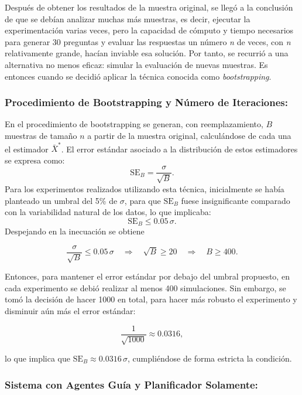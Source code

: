 \documentclass[10pt]{llncs}
\begin{document}
Después de obtener los resultados de la muestra original, se llegó a la conclusión de que se debían analizar muchas más muestras, es decir, ejecutar la experimentación varias veces, pero la capacidad de cómputo y tiempo necesarios para generar 30 preguntas y evaluar las respuestas un número \textit{n} de veces, con \textit{n} relativamente 
grande, hacían inviable esa solución. Por tanto, se recurrió a una alternativa no menos eficaz: simular la evaluación de nuevas muestras. Es entonces cuando se decidió aplicar la técnica conocida como \textit{bootstrapping}.

\subsubsection{Procedimiento de Bootstrapping y Número de Iteraciones:}

En el procedimiento de bootstrapping se generan, con reemplazamiento, $B$ muestras de tamaño $n$ a partir de la muestra original, calculándose de cada una el estimador $\bar{X}^*$.
El error estándar asociado a la distribución de estos estimadores se expresa como:
\begin{equation}
\text{SE}_B = \frac{\sigma}{\sqrt{B}}.
\end{equation}
Para los experimentos realizados utilizando esta técnica, inicialmente se había planteado un umbral del 5\% de $\sigma$, para que $\text{SE}_B$ fuese insignificante comparado con la variabilidad natural de los datos, lo que implicaba:
\begin{equation}
\text{SE}_B \leq 0.05\,\sigma.
\end{equation}
Despejando en la inecuación se obtiene


\[
\frac{\sigma}{\sqrt{B}} \leq 0.05\,\sigma \quad \Longrightarrow \quad \sqrt{B} \geq 20 \quad \Longrightarrow \quad B \geq 400.
\]


Entonces, para mantener el error estándar por debajo del umbral propuesto, en cada experimento se debió realizar al menos 400 simulaciones. Sin embargo, se tomó la decisión de 
hacer 1000 en total, para hacer más robusto el experimento y disminuir aún más el error estándar:


\[
\frac{1}{\sqrt{1000}} \approx 0.0316,
\]


lo que implica que $\text{SE}_B\approx 0.0316\,\sigma$, cumpliéndose de forma estricta la condición.


\subsubsection{Sistema con Agentes Guía y Planificador Solamente:}
\end{document}
